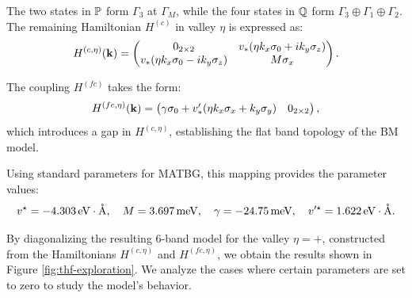 The two states in $\bP$ form $\Gamma_3$ at $\Gamma_M$, while the four states in $\bQ$ form $\Gamma_3 \oplus \Gamma_1 \oplus \Gamma_2$. The remaining Hamiltonian $H^{(c)}$ in valley $\eta$ is expressed as:
\begin{equation} \label{eq:H(c)_topoheavyfermion}
H^{(c, \eta)}(\k) =
\begin{pmatrix}
0_{2\times 2} & v_* (\eta k_x \sigma_0 + i k_y \sigma_z) \\
v_* (\eta k_x \sigma_0 - i k_y \sigma_z) & M \sigma_x
\end{pmatrix}.
\end{equation}

The coupling $H^{(fc)}$ takes the form:
\begin{equation} \label{eq:H(fc)_topoheavyfermion}
H^{(fc, \eta)}(\k) =
\begin{pmatrix}
\gamma \sigma_0 + v'_* (\eta k_x \sigma_x + k_y \sigma_y) & 0_{2\times 2}
\end{pmatrix},
\end{equation}
which introduces a gap in $H^{(c, \eta)}$, establishing the flat band topology of the BM model.

Using standard parameters for MATBG, this mapping provides the parameter values:
\begin{equation} \label{eq:paramaters_topoheavyfermion}
v^\star = -4.303 \, \text{eV} \cdot \AA, \quad M = 3.697 \, \text{meV}, \quad \gamma = -24.75 \, \text{meV}, \quad v'^\star = 1.622 \, \text{eV} \cdot \AA.
\end{equation}

By diagonalizing the resulting 6-band model for the valley $\eta = +$, constructed from the Hamiltonians $H^{(c,\eta)}$ and $H^{(fc,\eta)}$, we obtain the results shown in Figure \ref{fig:thf-exploration}. We analyze the cases where certain parameters are set to zero to study the model's behavior.

